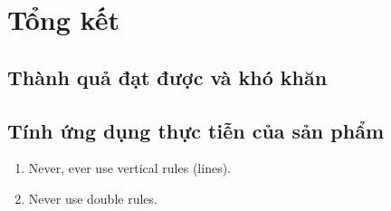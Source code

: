\chapter{Tổng kết}

\ifpdf
    \graphicspath{{Chapter3/Figs/Raster/}{Chapter3/Figs/PDF/}{Chapter3/Figs/}}
\else
    \graphicspath{{Chapter3/Figs/Vector/}{Chapter3/Figs/}}
\fi
\section{Thành quả đạt được và khó khăn}

\section{Tính ứng dụng thực tiễn của sản phẩm}

\begin{enumerate}
  \item Never, ever use vertical rules (lines).
  \item Never use double rules.
\end{enumerate}

